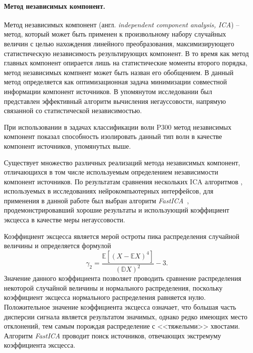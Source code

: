 \documentclass[12pt,a4paper,oneside,fleqn,leqno]{article}
\newcounter{pe} %
\begin{document}
	\paragraph{Метод независимых компонент.}
	\par Метод независимых компонент (англ. {\it independent component analysis, ICA}) -- метод, который может быть применен к произвольному набору случайных величин с целью нахождения линейного преобразования, максимизирующего статистическую независимость результирующих компонент. В то время как метод главных компонент опирается лишь на статистические моменты второго порядка, метод независимых компнент может быть назван его обобщением. В \cite{Cachenoura} данный метод определяется как оптимизационная задача минимизации совместной информации компонент источников. В упомянутом исследовании был представлен эффективный алгоритм вычисления негауссовости, напрямую связанной со статистической независимостью.
	\par При использовании в задачах классификации волн P300 метод независимых компонент показал способность изолировать данный тип волн в качестве компонент источников, упомянутых выше.
	\par Существует множество различных реализаций метода независимых компонент, отличающихся в том числе используемым определением независимости компонент источников. По результатам сравнения нескольких ICA алгоритмов \cite{Cachenoura}, используемых  в исследованиях нейрокомпьютерных интерфейсов, для применения в данной работе был выбран алгоритм {\it FastICA}~\cite{FastICA}, продемонстрировавший хорошие результаты и использующий коэффициент эксцесса в качестве меры негауссовости.
	\par Коэффициент эксцесса является мерой остроты пика распределения случайной величины и  определяется формулой 
	$$\gamma_2 = \frac{\mathbb{E} [(X - \mathbb{E} X)^4]}{(\mathbb{D} X)^2} - 3.$$
	Значение данного коэффициента позволяет проводить сравнение распределения некоторой случайной величины и нормального распределения, поскольку коэффициент эксцесса нормального распределения равняется нулю. Положительное значение коэффициента эксцесса означает, что большая часть дисперсии сигнала является результатом значимых, однако редко имеющих место отклонений, тем самым порождая распределение с <<тяжелыми>> хвостами. Алгоритм {\it FastICA} проводит поиск источников, отвечающих экстремуму коэффициента эксцесса.
	\newline
	
\end{document}
